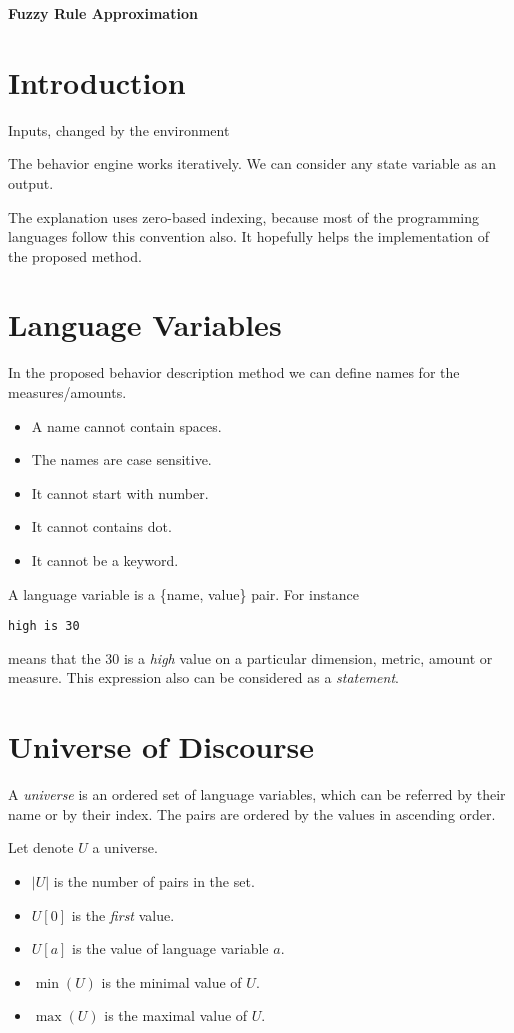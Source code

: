 \documentclass[a4paper,12pt]{article}
\begin{document}
\begin{center}
    \Large \textbf{Fuzzy Rule Approximation}
\end{center}

\section{Introduction}

Inputs, changed by the environment

The behavior engine works iteratively.
We can consider any state variable as an output.

The explanation uses zero-based indexing, because most of the programming languages follow this convention also. It hopefully helps the implementation of the proposed method.

\section{Language Variables}

In the proposed behavior description method we can define names for the measures/amounts.
\begin{itemize}
    \item A name cannot contain spaces.
    \item The names are case sensitive.
    \item It cannot start with number.
    \item It cannot contains dot.
    \item It cannot be a keyword.
\end{itemize}
A language variable is a \{name, value\} pair.
For instance
\begin{verbatim}
high is 30
\end{verbatim}
means that the 30 is a \emph{high} value on a particular dimension, metric, amount or measure.
This expression also can be considered as a \textit{statement}.

\section{Universe of Discourse}

A \textit{universe} is an ordered set of language variables, which can be referred by their name or by their index. The pairs are ordered by the values in ascending order.

Let denote $U$ a universe.
\begin{itemize}
    \item $|U|$ is the number of pairs in the set.
    \item $U[0]$ is the \emph{first} value.
    \item $U[a]$ is the value of language variable $a$.
    \item $\min(U)$ is the minimal value of $U$.
    \item $\max(U)$ is the maximal value of $U$.
\end{itemize}
\end{document}
